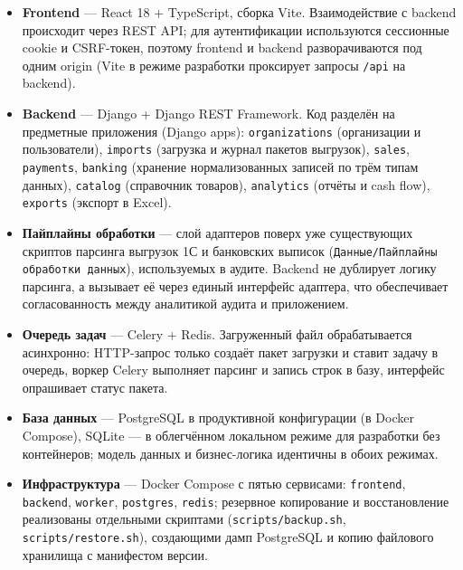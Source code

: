 \begin{itemize}
  \item \textbf{Frontend} --- React 18 + TypeScript, сборка Vite. Взаимодействие с backend происходит через REST API; для аутентификации используются сессионные cookie и CSRF-токен, поэтому frontend и backend разворачиваются под одним origin (Vite в режиме разработки проксирует запросы \texttt{/api} на backend).
  \item \textbf{Backend} --- Django + Django REST Framework. Код разделён на предметные приложения (Django apps): \texttt{organizations} (организации и пользователи), \texttt{imports} (загрузка и журнал пакетов выгрузок), \texttt{sales}, \texttt{payments}, \texttt{banking} (хранение нормализованных записей по трём типам данных), \texttt{catalog} (справочник товаров), \texttt{analytics} (отчёты и cash flow), \texttt{exports} (экспорт в Excel).
  \item \textbf{Пайплайны обработки} --- слой адаптеров поверх уже существующих скриптов парсинга выгрузок 1С и банковских выписок (\texttt{Данные/Пайплайны обработки данных}), используемых в аудите. Backend не дублирует логику парсинга, а вызывает её через единый интерфейс адаптера, что обеспечивает согласованность между аналитикой аудита и приложением.
  \item \textbf{Очередь задач} --- Celery + Redis. Загруженный файл обрабатывается асинхронно: HTTP-запрос только создаёт пакет загрузки и ставит задачу в очередь, воркер Celery выполняет парсинг и запись строк в базу, интерфейс опрашивает статус пакета.
  \item \textbf{База данных} --- PostgreSQL в продуктивной конфигурации (в Docker Compose), SQLite --- в облегчённом локальном режиме для разработки без контейнеров; модель данных и бизнес-логика идентичны в обоих режимах.
  \item \textbf{Инфраструктура} --- Docker Compose с пятью сервисами: \texttt{frontend}, \texttt{backend}, \texttt{worker}, \texttt{postgres}, \texttt{redis}; резервное копирование и восстановление реализованы отдельными скриптами (\texttt{scripts/backup.sh}, \texttt{scripts/restore.sh}), создающими дамп PostgreSQL и копию файлового хранилища с манифестом версии.
\end{itemize}

